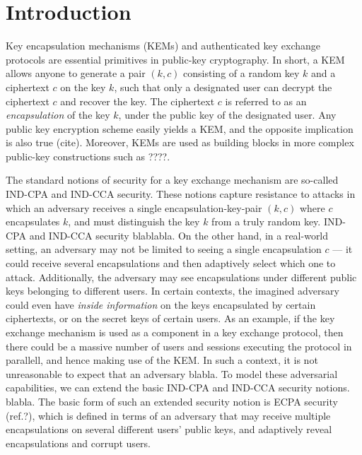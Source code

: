 
\section{Introduction}
Key encapsulation mechanisms (KEMs) and authenticated key exchange protocols are essential primitives in public-key cryptography.
In short, a KEM allows anyone to generate a pair \((k,c)\)
consisting of a random key \(k\) and a ciphertext \(c\) on the key \(k\),
such that only a designated user can decrypt the ciphertext \(c\) and recover the key.
The ciphertext \(c\) is referred to as an \emph{encapsulation} of the key \(k\),
under the public key of the designated user.
Any public key encryption scheme easily yields a KEM, and the opposite implication is also true (cite).
Moreover, KEMs are used as building blocks in more complex public-key constructions such as ????.

The standard notions of security for a key exchange mechanism are so-called IND-CPA and IND-CCA security.
These notions capture resistance to attacks in which an adversary receives a single
encapsulation-key-pair \((k,c)\) where \(c\) encapsulates \(k\),
and must distinguish the key \(k\) from a truly random key.
IND-CPA and IND-CCA security blablabla.
On the other hand, in a real-world setting,
an adversary may not be limited to seeing a single encapsulation \(c\)
--- it could receive several encapsulations and then adaptively select which one to attack.
Additionally, the adversary may see encapsulations under different public keys belonging to different users.
In certain contexts, the imagined adversary could even have \emph{inside information}
on the keys encapsulated by certain ciphertexts, or on the secret keys of certain users.
As an example, if the key exchange mechanism is used as a component in a key exchange protocol,
then there could be a massive number of users and sessions executing the protocol in parallell,
and hence making use of the KEM.
In such a context, it is not unreasonable to expect that an adversary blabla.
To model these adversarial capabilities,
we can extend the basic IND-CPA and IND-CCA security notions.
blabla.
The basic form of such an extended security notion is ECPA security (ref.?),
which is defined in terms of an adversary that may receive multiple encapsulations
on several different users' public keys, and adaptively reveal encapsulations and corrupt users.

